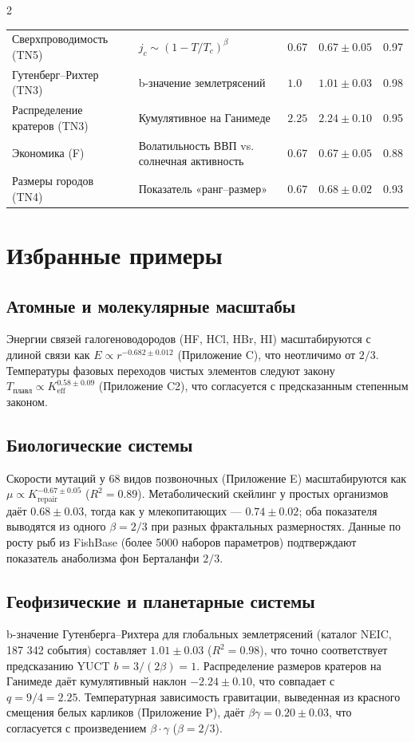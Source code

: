 \documentclass[11pt,a4paper]{article}
\newcommand{\betaf}{\beta}
\begin{document}
\begin{multicols}{2}
\begin{table}[htbp]
\begin{tabular}{p{3.5cm}p{5.0cm}p{2.1cm}p{3.5cm}p{1.4cm}}
				Сверхпроводимость (TN5) & \(j_c \sim (1-T/T_c)^{\beta}\) & \(0.67\) & \(0.67 \pm 0.05\) & 0.97 \\
				Гутенберг–Рихтер (TN3) & b-значение землетрясений & \(1.0\) & \(1.01 \pm 0.03\) & 0.98 \\
				Распределение кратеров (TN3) & Кумулятивное на Ганимеде & \(2.25\) & \(2.24 \pm 0.10\) & 0.95 \\
				Экономика (F) & Волатильность ВВП vs. солнечная активность & \(0.67\) & \(0.67 \pm 0.05\) & 0.88 \\
				Размеры городов (TN4) & Показатель «ранг–размер» & \(0.67\) & \(0.68 \pm 0.02\) & 0.93 \\
				\bottomrule
			\end{tabular}
		\end{table}
		
		\section{Избранные примеры}
		
		\subsection{Атомные и молекулярные масштабы}
		Энергии связей галогеноводородов (HF, HCl, HBr, HI) масштабируются с длиной связи как \(E \propto r^{-0.682\pm0.012}\) (Приложение C), что неотличимо от \(2/3\). Температуры фазовых переходов чистых элементов следуют закону \(T_{\text{плавл}} \propto K_{\mathrm{eff}}^{0.58\pm0.09}\) (Приложение C2), что согласуется с предсказанным степенным законом.
		
		\subsection{Биологические системы}
		Скорости мутаций у 68 видов позвоночных (Приложение E) масштабируются как \(\mu \propto K_{\mathrm{repair}}^{-0.67\pm0.05}\) (\(R^2=0.89\)). Метаболический скейлинг у простых организмов даёт \(0.68\pm0.03\), тогда как у млекопитающих — \(0.74\pm0.02\); оба показателя выводятся из одного \(\betaf = 2/3\) при разных фрактальных размерностях. Данные по росту рыб из FishBase (более 5000 наборов параметров) подтверждают показатель анаболизма фон Берталанфи \(2/3\).
		
		\subsection{Геофизические и планетарные системы}
		b-значение Гутенберга–Рихтера для глобальных землетрясений (каталог NEIC, 187 342 события) составляет \(1.01\pm0.03\) (\(R^2=0.98\)), что точно соответствует предсказанию YUCT \(b = 3/(2\betaf) = 1\). Распределение размеров кратеров на Ганимеде даёт кумулятивный наклон \(-2.24\pm0.10\), что совпадает с \(q = 9/4 = 2.25\). Температурная зависимость гравитации, выведенная из красного смещения белых карликов (Приложение P), даёт \(\beta\gamma = 0.20 \pm 0.03\), что согласуется с произведением \(\betaf \cdot \gamma\) (\(\betaf = 2/3\)).
		

\end{multicols}
\end{document}
